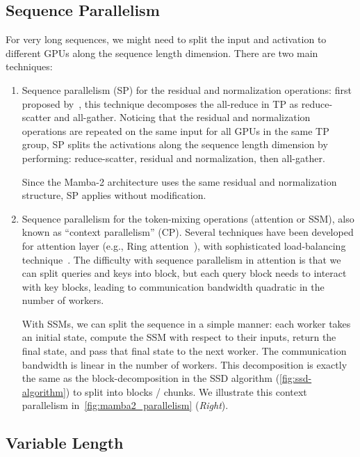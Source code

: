 \documentclass{article}
\newcommand{\citep}{\parencite}
\newcommand{\citet}{\textcite}
\begin{document}
\subsection{Sequence Parallelism}
\label{subsec:sp}

For very long sequences, we might need to split the input and activation to different GPUs along the sequence length dimension.
There are two main techniques:
\begin{enumerate}
\item Sequence parallelism (SP) for the residual and normalization operations: first proposed by~\citet{korthikanti2023reducing}, this technique decomposes the all-reduce in TP as reduce-scatter and all-gather. Noticing that the residual and normalization operations are repeated on the same input for all GPUs in the same TP group, SP splits the activations along the sequence length dimension by performing: reduce-scatter, residual and normalization, then all-gather.

Since the Mamba-2 architecture uses the same residual and normalization structure, SP applies without modification.

\item Sequence parallelism for the token-mixing operations (attention or SSM), also known as ``context parallelism'' (CP).
Several techniques have been developed for attention layer (e.g., Ring attention~\citep{liu2023ring, liu2024world}), with sophisticated load-balancing technique~\citep{brandon2023striped}.
The difficulty with sequence parallelism in attention is that we can split queries and keys into block, but each query block needs to interact with key blocks, leading to communication bandwidth quadratic in the number of workers.

With SSMs, we can split the sequence in a simple manner: each worker takes an initial state, compute the SSM with respect to their inputs, return the final state, and pass that final state to the next worker.
The communication bandwidth is linear in the number of workers.
This decomposition is exactly the same as the block-decomposition in the SSD algorithm (\cref{fig:ssd-algorithm}) to split into blocks / chunks.
We illustrate this context parallelism in~\cref{fig:mamba2_parallelism} (\emph{Right}).

\end{enumerate}

\subsection{Variable Length}
\label{subsec:varlen}
\end{document}
